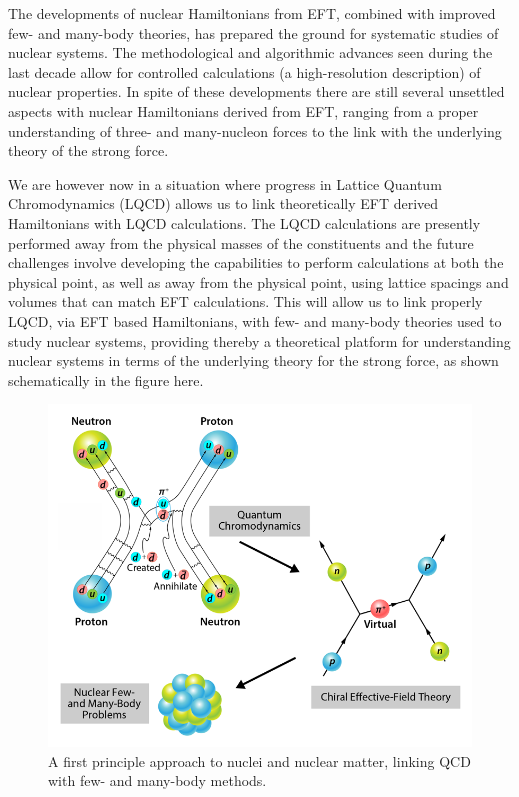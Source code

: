 \documentclass[10pt]{article}
\begin{document}
The developments of nuclear Hamiltonians from EFT, combined with
improved few- and many-body theories, has prepared the ground for
systematic studies of nuclear systems. The methodological and
algorithmic advances seen during the last decade allow for controlled
calculations (a high-resolution description) of nuclear properties. In
spite of these developments there are still several unsettled aspects
with nuclear Hamiltonians derived from EFT, ranging from a proper
understanding of three- and many-nucleon forces to the link with the
underlying theory of the strong force.

We are however now in a situation where progress in Lattice Quantum
Chromodynamics (LQCD) \cite{lqcd1,lqcd2} allows us to link
theoretically EFT derived Hamiltonians with LQCD calculations. The
LQCD calculations are presently performed away from the physical
masses of the constituents and the future challenges involve
developing the capabilities to perform calculations at both the
physical point, as well as away from the physical point, using lattice
spacings and volumes that can match EFT calculations.  This will allow
us to link properly LQCD, via EFT based Hamiltonians, with few- and
many-body theories used to study nuclear systems, providing thereby a
theoretical platform for understanding nuclear systems in terms of the
underlying theory for the strong force, as shown schematically in the
figure here.

\begin{figure}[hbtp]
\begin{center}
  \includegraphics[width=.6\linewidth]{Figures/manybody.png}
\end{center}
\caption{A first principle approach to nuclei and nuclear matter, linking QCD with few- and many-body methods.}
\end{figure}
\end{document}
